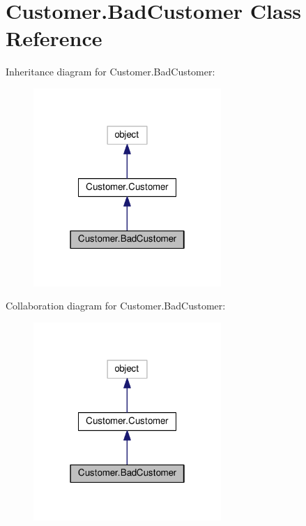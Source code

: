 \hypertarget{class_customer_1_1_bad_customer}{}\section{Customer.\+Bad\+Customer Class Reference}
\label{class_customer_1_1_bad_customer}


Inheritance diagram for Customer.\+Bad\+Customer\+:\nopagebreak
\begin{figure}[H]
\begin{center}
\leavevmode
\includegraphics[width=202pt]{class_customer_1_1_bad_customer__inherit__graph}
\end{center}
\end{figure}


Collaboration diagram for Customer.\+Bad\+Customer\+:\nopagebreak
\begin{figure}[H]
\begin{center}
\leavevmode
\includegraphics[width=202pt]{class_customer_1_1_bad_customer__coll__graph}
\end{center}
\end{figure}
